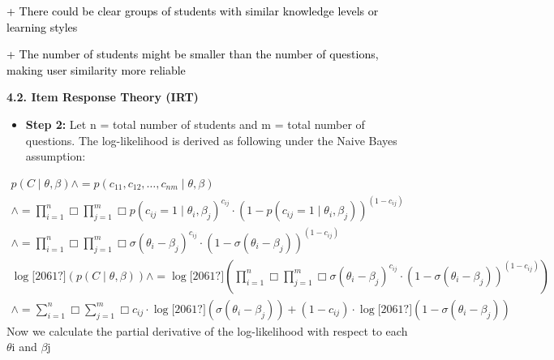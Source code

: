 \documentclass[letterpaper]{article}
\begin{document}
\textcolor{black}{+ There could be clear groups of students with similar knowledge levels or learning styles}

\textcolor{black}{+ The number of students might be smaller than the number of questions, making user similarity more
reliable}

\textbf{4.2. Item Response Theory (IRT) }

\begin{itemize}[resume*=listWWNumii,start=1]
\item \textbf{Step 2:} Let n = total number of students and m = total number of questions. The log-likelihood is derived
as following under the Naive Bayes assumption: 
\end{itemize}
\begin{equation*}
\begin{matrix}p(C{\mid}\theta ,\beta )\wedge =p\left(c_{11},c_{12},\dots{},c_{\mathit{nm}}{\mid}\theta ,\beta
\right)\\\wedge =\prod _{i=1}^n\Box \prod _{j=1}^m\Box p\left(c_{\mathit{ij}}=1{\mid}\theta _i,\beta
_j\right)^{c_{\mathit{ij}}}{\cdot}\left(1-p\left(c_{\mathit{ij}}=1{\mid}\theta _i,\beta
_j\right)\right)^{\left(1-c_{\mathit{ij}}\right)}\\\wedge =\prod _{i=1}^n\Box \prod _{j=1}^m\Box \sigma \left(\theta
_i-\beta _j\right)^{c_{\mathit{ij}}}{\cdot}\left(1-\sigma \left(\theta _i-\beta
_j\right)\right)^{\left(1-c_{\mathit{ij}}\right)}\\\log \text{[2061?]}(p(C{\mid}\theta ,\beta ))\wedge =\log
\text{[2061?]}\left(\prod _{i=1}^n\Box \prod _{j=1}^m\Box \sigma \left(\theta _i-\beta
_j\right)^{c_{\mathit{ij}}}{\cdot}\left(1-\sigma \left(\theta _i-\beta
_j\right)\right)^{\left(1-c_{\mathit{ij}}\right)}\right)\\\wedge =\sum _{i=1}^n\Box \sum _{j=1}^m\Box
c_{\mathit{ij}}{\cdot}\log \text{[2061?]}\left(\sigma \left(\theta _i-\beta
_j\right)\right)+\left(1-c_{\mathit{ij}}\right){\cdot}\log \text{[2061?]}\left(1-\sigma \left(\theta _i-\beta
_j\right)\right)\end{matrix}
\end{equation*}
Now we calculate the partial derivative of the log-likelihood with respect to each $\theta $i and $\beta $j 
\end{document}

